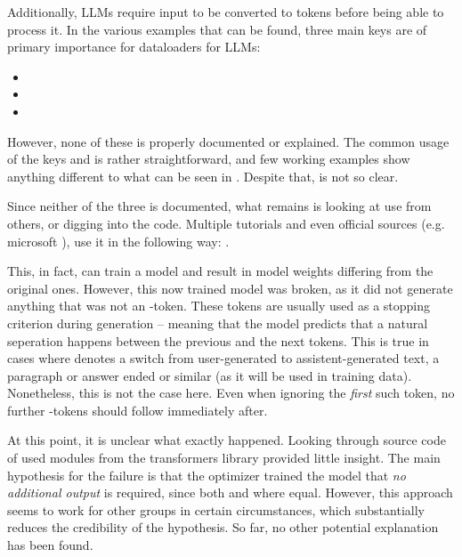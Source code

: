 Additionally, \glspl{LLM} require input to be converted to tokens before being able to process it.
In the various examples that can be found, three main keys are of primary importance for dataloaders for \glspl{LLM}:

\begin{itemize}
    \item {}
    \item {}
    \item {}
\end{itemize}


However, none of these is properly documented or explained.
The common usage of the keys  and  is rather straightforward, and few working examples show anything different to what can be seen in .
Despite that,  is not so clear.

Since neither of the three is documented, what remains is looking at use from others, or digging into the code.
Multiple tutorials and even official sources (e.g. microsoft \cite{deepspeedexamples_2023}), use it in the following way: .

This, in fact, can train a model and result in model weights differing from the original ones.
However, this now trained model was broken, as it did not generate anything that was not an -token.
These tokens are usually used as a stopping criterion during generation -- meaning that the model predicts that a natural seperation happens between the previous and the next tokens. 
This is true in cases where  denotes a switch from user-generated to assistent-generated text, a paragraph or answer ended or similar (as it will be used in training data).
Nonetheless, this is not the case here. Even when ignoring the \textit{first} such token, no further -tokens should follow immediately after.

At this point, it is unclear what exactly happened.
Looking through source code of used modules from the \gls{transformers} library provided little insight.
The main hypothesis for the failure is that the optimizer trained the model that \textit{no additional output} is required, since both  and  where equal.
However, this approach seems to work for other groups in certain circumstances, which substantially reduces the credibility of the hypothesis.
So far, no other potential explanation has been found.

